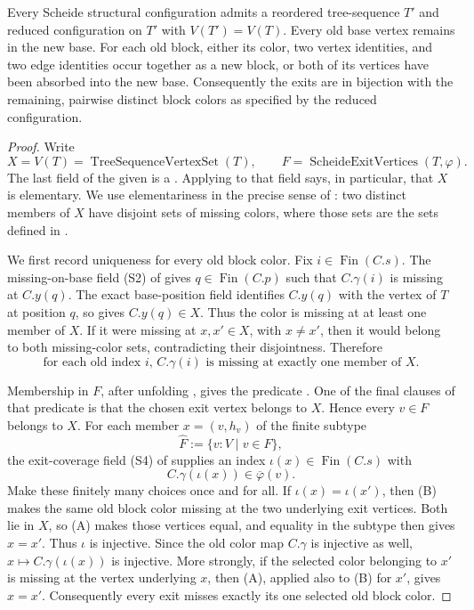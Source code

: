 \begin{lemma}
Every Scheide structural configuration admits a reordered tree-sequence
$T'$ and reduced configuration on $T'$ with $V(T')=V(T)$.  Every old base
vertex remains in the new base.  For each old block, either its color,
two vertex identities, and two edge identities occur together as a new
block, or both of its vertices have been absorbed into the new base.
Consequently the exits are in bijection with the remaining, pairwise
distinct block colors as specified by the reduced configuration.
\end{lemma}
\begin{proof}
Write
\[
 X=V(T)=\operatorname{TreeSequenceVertexSet}(T),\qquad
 F=\operatorname{ScheideExitVertices}(T,\varphi).
\]
The last field of the given
 is a
.  Applying
 to that field says, in particular,
that $X$ is elementary.  We use elementariness in the precise sense of
: two distinct members of $X$ have
disjoint sets of missing colors, where those sets are the sets defined in
.

We first record uniqueness for every old block color.  Fix
$i\in\operatorname{Fin}(C.s)$.  The missing-on-base field (S2) of
 gives $q\in\operatorname{Fin}(C.p)$
such that $C.\gamma(i)$ is missing at $C.y(q)$.  The exact base-position
field identifies $C.y(q)$ with the vertex of $T$ at position $q$, so
 gives $C.y(q)\in X$.  Thus the color is
missing at at least one member of $X$.  If it were missing at
$x,x'\in X$, with $x\ne x'$, then it would belong to both missing-color
sets, contradicting their disjointness.  Therefore
\[
 \tag{A}
 \text{for each old index $i$, $C.\gamma(i)$ is missing at exactly one
 member of $X$.}
\]

Membership in $F$, after unfolding , gives
the predicate .  One of the final clauses of
that predicate is that the chosen exit vertex belongs to $X$.  Hence every
$v\in F$ belongs to $X$.  For each member $x=(v,h_v)$ of the finite subtype
\[
 \widehat F:=\{v:V\mid v\in F\},
\]
the exit-coverage field (S4) of
 supplies an index
$\iota(x)\in\operatorname{Fin}(C.s)$ with
\[
 \tag{B} C.\gamma(\iota(x))\in\overline\varphi(v).
\]
Make these finitely many choices once and for all.  If
$\iota(x)=\iota(x')$, then (B) makes the same old block color missing at
the two underlying exit vertices.  Both lie in $X$, so (A) makes those
vertices equal, and equality in the subtype then gives $x=x'$.  Thus
$\iota$ is injective.  Since the old color map $C.\gamma$ is injective as
well, $x\mapsto C.\gamma(\iota(x))$ is injective.  More strongly, if the
selected color belonging to $x'$ is missing at the vertex underlying $x$,
then (A), applied also to (B) for $x'$, gives $x=x'$.  Consequently every
exit misses exactly its one selected old block color.


\end{proof}
